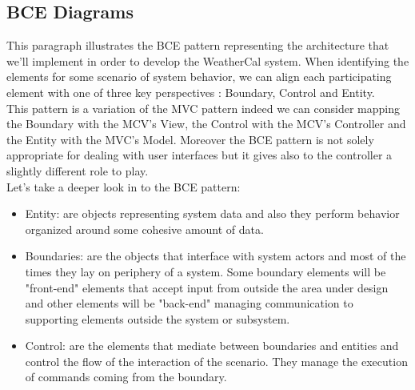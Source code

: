 \subsection{BCE Diagrams} \label{sec:BCE}
This paragraph illustrates the BCE pattern representing the architecture that we'll implement in order to develop the WeatherCal system. When identifying the elements for some scenario of system behavior, we can align each participating element with one of three key perspectives : Boundary, Control and Entity. \\This  pattern is a variation of the MVC pattern indeed we can consider mapping the Boundary with the MCV's View, the Control with the MCV's Controller and the Entity with the MVC's Model. Moreover the BCE pattern is not solely appropriate for dealing with user interfaces but it gives also to the controller a slightly different role to play.\\Let's take a deeper look in to the BCE pattern:\begin{itemize}
\item Entity: are objects representing system data and also they perform behavior organized around some cohesive amount of data.
\item Boundaries: are the objects that interface with system actors and most of the times they lay on periphery of a system. Some boundary elements will be "front-end" elements that accept input from outside the area under design and other elements will be "back-end" managing communication to supporting elements outside the system or subsystem.
\item Control: are the elements that mediate between boundaries and entities and control the flow of the interaction of the scenario. They manage the execution of commands coming from the boundary.

\end{itemize}
